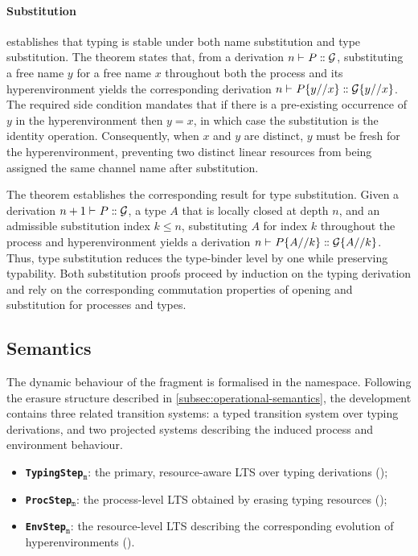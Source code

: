 \paragraph{Substitution}
 establishes that typing is stable under both name substitution and type substitution. The theorem  states that, from a derivation ${{}n \vdash_{} P \mathrel{:\mspace{-1mu}:} \mathcal{G}}$, substituting a free name $y$ for a free name $x$ throughout both the process and its hyperenvironment yields the corresponding derivation ${{}n \vdash_{} P\{y // x\} \mathrel{:\mspace{-1mu}:} \mathcal{G}\{y // x\}}$. The required side condition mandates that if there is a pre-existing occurrence of $y$ in the hyperenvironment then $y=x$, in which case the substitution is the identity operation. Consequently, when $x$ and $y$ are distinct, $y$ must be fresh for the hyperenvironment, preventing two distinct linear resources from being assigned the same channel name after substitution.

The theorem  establishes the corresponding result for type substitution. Given a derivation ${{}n+1 \vdash_{} P \mathrel{:\mspace{-1mu}:} \mathcal{G}}$, a type $A$ that is locally closed at depth $n$, and an admissible substitution index $k \leq n$, substituting $A$ for index $k$ throughout the process and hyperenvironment yields a derivation ${{}n \vdash_{} P\{A // k\} \mathrel{:\mspace{-1mu}:} \mathcal{G}\{A // k\}}$. Thus, type substitution reduces the type-binder level by one while preserving typability. Both substitution proofs proceed by induction on the typing derivation and rely on the corresponding commutation properties of opening and substitution for processes and types.

\subsection{Semantics}\label{subsec:semantics}
The dynamic behaviour of the \pimll{} fragment is formalised in the  namespace. Following the erasure structure described in \cref{subsec:operational-semantics}, the development contains three related transition systems: a typed transition system over typing derivations, and two projected systems describing the induced process and environment behaviour.

\begin{itemize}
  \item \textbf{\texttt{TypingStep}$_\texttt{m}$}: the primary, resource-aware LTS over typing derivations ();
  \item \textbf{\texttt{ProcStep}$_\texttt{m}$}: the process-level LTS obtained by erasing typing resources ();
  \item \textbf{\texttt{EnvStep}$_\texttt{m}$}: the resource-level LTS describing the corresponding evolution of hyperenvironments ().
\end{itemize}

